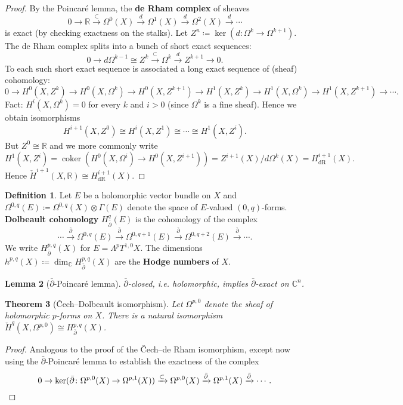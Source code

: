 \documentclass{report}
\theoremstyle{plain}
\newtheorem{theorem}{Theorem}[section]
\newtheorem{lemma}[theorem]{Lemma}
\theoremstyle{definition}
\newtheorem{definition}[theorem]{Definition}
\theoremstyle{remark}
\newcommand{\di}{\partial}
\newcommand{\bC}{\mathbb{C}}
\newcommand{\bR}{\mathbb{R}}
\DeclareMathOperator{\coker}{coker}
\newcommand{\chH}{\check{H}}
\newcommand{\dR}{\mathrm{dR}}
\newcommand{\bdi}{\bar{\di}}
\begin{document}
\begin{proof}
  By the Poincar\'e lemma, the {\bf de Rham complex} of sheaves
  \[ 0 \to \bR \xrightarrow{\subset} \Omega^0(X) \xrightarrow{d} \Omega^1(X) \xrightarrow{d} \Omega^2(X) \xrightarrow{d} \cdots \]
  is exact (by checking exactness on the stalks). Let $Z^n \coloneqq
  \ker(d\colon \Omega^k \to \Omega^{k+1})$. The de Rham complex splits
  into a bunch of short exact sequences:
  \[ 0 \to d\Omega^{k-1} \cong Z^k \xrightarrow{\subset} \Omega^k \xrightarrow{d} Z^{k+1} \to 0. \]
  To each such short exact sequence is associated a long exact
  sequence of (sheaf) cohomology:
  \[ 0 \to H^0(X, Z^k) \to H^0(X, \Omega^k) \to H^0(X, Z^{k+1}) \to H^1(X, Z^k) \to H^1(X, \Omega^k) \to H^1(X, Z^{k+1}) \to \cdots. \]
  Fact: $H^i(X, \Omega^k) = 0$ for every $k$ and $i > 0$ (since
  $\Omega^k$ is a fine sheaf). Hence we obtain isomorphisms
  \[ H^{i+1}(X, Z^0) \cong H^i(X, Z^1) \cong \cdots \cong H^1(X, Z^i). \]
  But $Z^0 \cong \bR$ and we more commonly write
  \[ H^1(X, Z^i) = \coker(H^0(X, \Omega^i) \to H^0(X, Z^{i+1})) = Z^{i+1}(X)/d\Omega^k(X) = H^{i+1}_{\dR}(X). \]
  Hence $\chH^{i+1}(X, \bR) \cong H^{i+1}_{\dR}(X)$.
\end{proof}

\begin{definition}
  Let $E$ be a holomorphic vector bundle on $X$ and $\Omega^{0,q}(E)
  \coloneqq \Omega^{0,q}(X) \otimes \Gamma(E)$ denote the space of
  $E$-valued $(0,q)$-forms. {\bf Dolbeault cohomology} $H^q_{\bdi}(E)$
  is the cohomology of the complex
  \[ \cdots \xrightarrow{\bdi} \Omega^{0,q}(E) \xrightarrow{\bdi} \Omega^{0,q+1}(E) \xrightarrow{\bdi} \Omega^{0,q+2}(E) \xrightarrow{\bdi} \cdots. \]
  We write $H^{p,q}_{\bdi}(X)$ for $E = \Lambda^pT^{1,0}X$. The
  dimensions $h^{p,q}(X) \coloneqq \dim_{\bC} H^{p,q}_{\bdi}(X)$ are
  the {\bf Hodge numbers} of $X$.
\end{definition}

\begin{lemma}[$\bdi$-Poincar\'e lemma]
  $\bdi$-closed, i.e. holomorphic, implies $\bdi$-exact on $\bC^n$.
\end{lemma}

\begin{theorem}[\v Cech--Dolbeault isomorphism] \label{thm:cech-dolbeault}
  Let $\Omega^{p,0}$ denote the sheaf of holomorphic $p$-forms on $X$.
  There is a natural isomorphism $\chH^q(X, \Omega^{p,0}) \cong
  H^{p,q}_{\bdi}(X)$.
\end{theorem}

\begin{proof}
  Analogous to the proof of the \v Cech--de Rham isomorphism, except
  now using the $\bdi$-Poincar\'e lemma to establish the exactness of
  the complex
  \[ 0 \to \ker(\bdi\colon\Omega^{p,0}(X) \to \Omega^{p,1}(X)) \xrightarrow{\subset} \Omega^{p,0}(X) \xrightarrow{\bdi} \Omega^{p,1}(X) \xrightarrow{\bdi} \cdots. \qedhere \]
\end{proof}
\end{document}
